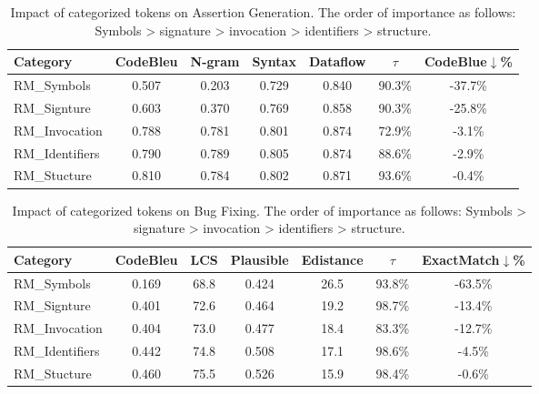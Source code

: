 \begin{table}[]
\caption{Impact of categorized tokens on Assertion Generation. The order of importance as follows: Symbols \textgreater\xspace signature \textgreater\xspace invocation \textgreater\xspace identifiers \textgreater\xspace structure.}
\begin{tabular}{l|cccccc}
\hline
Category            & CodeBleu & N-gram & Syntax & Dataflow & $\tau$ & CodeBlue$\downarrow$\%  \\ \hline
RM\_Symbols     & 0.507    & 0.203  & 0.729  & 0.840    & 90.3\% & -37.7\%                     \\
RM\_Signture    & 0.603    & 0.370  & 0.769  & 0.858    & 90.3\% & -25.8\%                     \\
RM\_Invocation  & 0.788    & 0.781  & 0.801  & 0.874    & 72.9\% & -3.1\%                  \\
RM\_Identifiers & 0.790    & 0.789  & 0.805  & 0.874    & 88.6\% & -2.9\%                      \\
RM\_Stucture    & 0.810    & 0.784  & 0.802  & 0.871    & 93.6\% & -0.4\%                    \\ \hline
\end{tabular}
\end{table}


\begin{table}[]
\caption{Impact of categorized tokens on Bug Fixing. The order of importance as follows: Symbols \textgreater\xspace signature \textgreater\xspace invocation \textgreater\xspace identifiers \textgreater\xspace structure.}
\begin{tabular}{l|cccccc}
\hline
Category        & CodeBleu & LCS  & Plausible & Edistance & $\tau$ & ExactMatch$\downarrow$\% \\ \hline
RM\_Symbols     & 0.169      & 68.8 & 0.424     & 26.5      & 93.8\% & -63.5\%                  \\
RM\_Signture    & 0.401      & 72.6 & 0.464     & 19.2      & 98.7\% & -13.4\%                  \\
RM\_Invocation  & 0.404      & 73.0 & 0.477     & 18.4      & 83.3\% & -12.7\%                  \\
RM\_Identifiers & 0.442      & 74.8 & 0.508     & 17.1      & 98.6\% & -4.5\%                   \\
RM\_Stucture    & 0.460      & 75.5 & 0.526     & 15.9      & 98.4\% & -0.6\%                   \\ \hline
\end{tabular}
\end{table}

